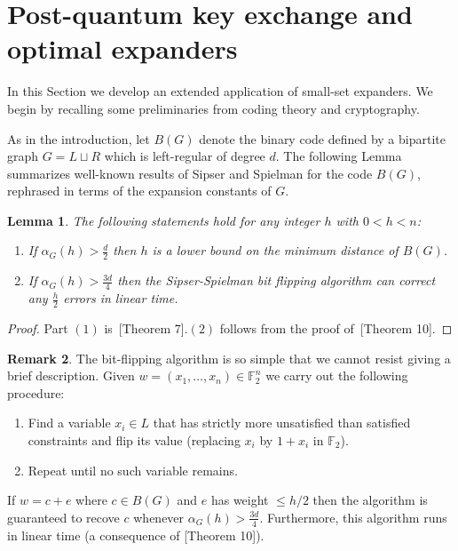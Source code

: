\documentclass[12pt]{amsart}
\newtheorem{lemma}{Lemma}[section]
\theoremstyle{definition}
\newtheorem{remark}[lemma]{Remark}
\renewcommand{\leq}{\leqslant}
\newcommand{\FF}{\ensuremath{\mathbb{F}}}
\newcommand{\1}{\ensuremath{\mathbb{1}}}
\begin{document}
\section{Post-quantum key exchange and optimal expanders}
\label{Sec: PQ}




In this Section we develop an extended application of small-set expanders. We begin by recalling some preliminaries from coding theory and cryptography.

As in the introduction, let $B(G)$ denote the binary code defined by a bipartite graph $G=L\sqcup R$ which is left-regular of degree $d$. The following Lemma summarizes well-known results of Sipser and Spielman for the code $B(G)$, rephrased in terms of the expansion constants of $G$. 

\begin{lemma}\label{lem: sisp} The following statements hold for any integer $h$ with $0<h<n$:
\begin{enumerate}
\item If $\alpha_G(h)>\frac{d}{2}$ then $h$ is a lower bound on the minimum distance of $B(G)$.
\item If $\alpha_G(h)>\frac{3d}{4}$ then the Sipser-Spielman bit flipping algorithm can correct any $\frac{h}{2}$ errors in linear time.
\end{enumerate}
\end{lemma}
\begin{proof} Part $(1)$ is~\cite{SiSp}[Theorem 7].$(2)$ follows from the proof of~\cite{SiSp}[Theorem 10]. 
\end{proof}
\begin{remark}
The bit-flipping algorithm is so simple that we cannot resist giving a brief description. Given $w=(x_1,\dots, x_n)\in \FF_2^{n}$ we carry out the following procedure:
\begin{enumerate}
\item Find a variable $x_i\in L$ that has strictly more unsatisfied than satisfied constraints and flip its value (replacing $x_i$ by $1+x_i$ in $\FF_2$).
\item Repeat until no such variable remains. 
\end{enumerate}
If $w=c+e$ where $c\in B(G)$ and $e$ has weight $\leq h/2$ then the algorithm is guaranteed to recove $c$ whenever $\alpha_G(h)>\frac{3d}{4}$. Furthermore, this algorithm runs in linear time (a consequence of \cite{SiSp}[Theorem 10]).
\end{remark}
\end{document}
